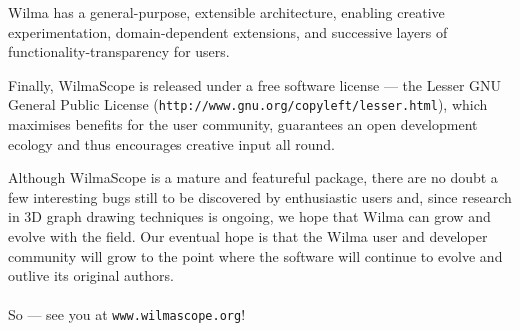 \documentclass[runningheads]{cl2emult}
\newcommand{\url}[1]{{\small{\tt #1}}}
\begin{document}
Wilma has a general-purpose, extensible architecture, enabling creative
experimentation, domain-dependent extensions, and successive layers of
functionality-transparency for users.

Finally, WilmaScope is released under a free software license --- the Lesser
GNU General Public License (\url{http://www.gnu.org/copyleft/lesser.html}),
which maximises benefits for the user community, guarantees an open
development ecology and thus encourages creative input all round.

Although WilmaScope is a mature and featureful package, there are no doubt a
few interesting bugs still to be discovered by enthusiastic users and, since
research in 3D graph drawing techniques is ongoing, we hope that Wilma can
grow and evolve with the field.  Our eventual hope is that the Wilma
user and developer community will grow to the point where the software
will 
continue to evolve and outlive its original authors.

\paragraph{}

So --- see you at \url{www.wilmascope.org}!

%
%
%
%
%
%
%


\newpage
{}


%
\end{document}
